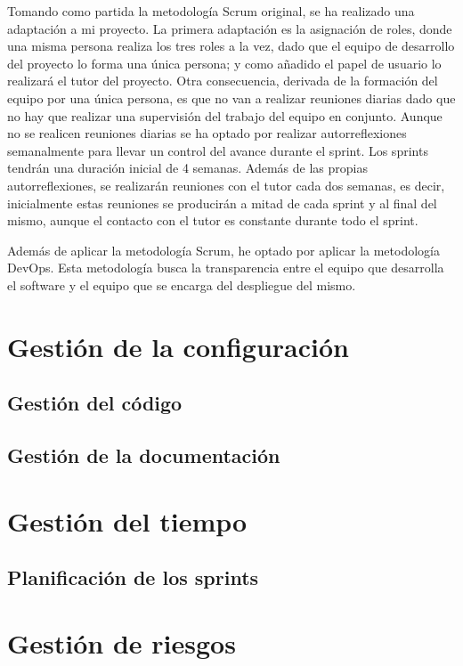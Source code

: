Tomando como partida la metodología Scrum original, se ha realizado una adaptación a mi proyecto. La primera adaptación es la asignación de roles, donde una misma persona realiza los tres roles a la vez, dado que el equipo de desarrollo del proyecto lo forma una única persona; y como añadido el papel de usuario lo realizará el tutor del proyecto. Otra consecuencia, derivada de la formación del equipo por una única persona, es que no van a realizar reuniones diarias dado que no hay que realizar una supervisión del trabajo del equipo en conjunto. Aunque no se realicen reuniones diarias se ha optado por realizar autorreflexiones semanalmente para llevar un control del avance durante el sprint. Los sprints tendrán una duración inicial de 4 semanas. Además de las propias autorreflexiones, se realizarán reuniones con el tutor cada dos semanas, es decir, inicialmente estas reuniones se producirán a mitad de cada sprint y al final del mismo, aunque el contacto con el tutor es constante durante todo el sprint.

Además de aplicar la metodología Scrum, he optado por aplicar la metodología DevOps. Esta metodología busca la transparencia entre el equipo que desarrolla el software y el equipo que se encarga del despliegue del mismo.


\section{Gestión de la configuración}


\subsection{Gestión del código}



\subsection{Gestión de la documentación}


\section{Gestión del tiempo}


\subsection{Planificación de los sprints}


\section{Gestión de riesgos}



